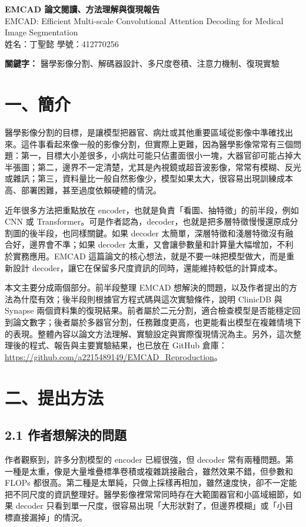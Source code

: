 \documentclass[a4paper,12pt,twocolumn]{article}
\begin{document}
\begin{center}
{\LARGE \textbf{EMCAD 論文閱讀、方法理解與復現報告}}\\[0.4em]
{\large EMCAD: Efficient Multi-scale Convolutional Attention Decoding for Medical Image Segmentation}\\[0.5em]
姓名：丁聖懿 \quad
學號：412770256
\end{center}

\textbf{關鍵字：} 醫學影像分割、解碼器設計、多尺度卷積、注意力機制、復現實驗

\section*{一、簡介}
醫學影像分割的目標，是讓模型把器官、病灶或其他重要區域從影像中準確找出來。這件事看起來像一般的影像分割，但實際上更難，因為醫學影像常常有三個問題：第一，目標大小差很多，小病灶可能只佔畫面很小一塊，大器官卻可能占掉大半張圖；第二，邊界不一定清楚，尤其是內視鏡或超音波影像，常常有模糊、反光或雜訊；第三，資料量比一般自然影像少，模型如果太大，很容易出現訓練成本高、部署困難，甚至過度依賴硬體的情況。

近年很多方法把重點放在 encoder，也就是負責「看圖、抽特徵」的前半段，例如 CNN 或 Transformer。可是作者認為，decoder，也就是把多層特徵慢慢還原成分割圖的後半段，也同樣關鍵。如果 decoder 太簡單，深層特徵和淺層特徵沒有融合好，邊界會不準；如果 decoder 太重，又會讓參數量和計算量大幅增加，不利於實務應用。EMCAD 這篇論文的核心想法，就是不要一味把模型做大，而是重新設計 decoder，讓它在保留多尺度資訊的同時，還能維持較低的計算成本。

本文主要分成兩個部分。前半段整理 EMCAD 想解決的問題，以及作者提出的方法為什麼有效；後半段則根據官方程式碼與這次實驗條件，說明 ClinicDB 與 Synapse 兩個資料集的復現結果。前者屬於二元分割，適合檢查模型是否能穩定回到論文數字；後者屬於多器官分割，任務難度更高，也更能看出模型在複雜情境下的表現。整體內容以論文方法理解、實驗設定與實際復現情況為主。另外，這次整理後的程式、報告與主要實驗結果，也已放在 GitHub 倉庫：\url{https://github.com/a2215489149/EMCAD_Reproduction}。

\section*{二、提出方法}
\subsection*{2.1 作者想解決的問題}
作者觀察到，許多分割模型的 encoder 已經很強，但 decoder 常有兩種問題。第一種是太重，像是大量堆疊標準卷積或複雜跳接融合，雖然效果不錯，但參數和 FLOPs 都很高。第二種是太單純，只做上採樣再相加，雖然速度快，卻不一定能把不同尺度的資訊整理好。醫學影像裡常常同時存在大範圍器官和小區域細節，如果 decoder 只看到單一尺度，很容易出現「大形狀對了，但邊界模糊」或「小目標直接漏掉」的情況。
\end{document}
